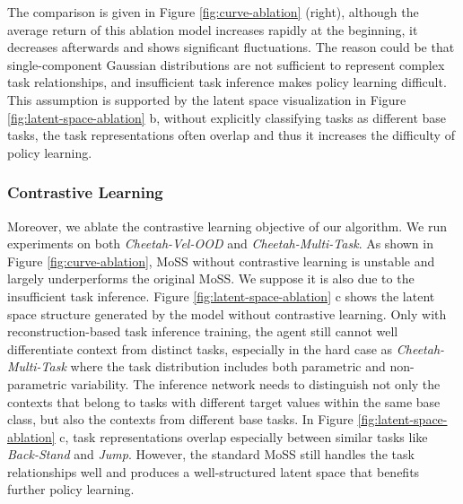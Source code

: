 \documentclass[letterpaper]{article} %
\begin{document}
The comparison is given in Figure \ref{fig:curve-ablation} (right), although the average return of this ablation model increases rapidly at the beginning, it decreases afterwards and shows significant fluctuations. The reason could be that single-component Gaussian distributions are not sufficient to represent complex task relationships, and insufficient task inference makes policy learning difficult. This assumption is supported by the latent space visualization in Figure \ref{fig:latent-space-ablation} b, without explicitly classifying tasks as different base tasks, the task representations often overlap and thus it increases the difficulty of policy learning.

\subsubsection{Contrastive Learning}
Moreover, we ablate the contrastive learning objective of our algorithm. We run experiments on both \emph{Cheetah-Vel-OOD } and \emph{Cheetah-Multi-Task}. As shown in Figure \ref{fig:curve-ablation}, MoSS without contrastive learning is unstable and largely underperforms the original MoSS. We suppose it is also due to the insufficient task inference. Figure \ref{fig:latent-space-ablation} c shows the latent space structure generated by the model without contrastive learning. Only with reconstruction-based task inference training, the agent still cannot well differentiate context from distinct tasks, especially in the hard case as \emph{Cheetah-Multi-Task} where the task distribution includes both parametric and non-parametric variability. The inference network needs to distinguish not only the contexts that belong to tasks with different target values within the same base class, but also the contexts from different base tasks. In Figure \ref{fig:latent-space-ablation} c, task representations overlap especially between similar tasks like \emph{Back-Stand} and \emph{Jump}. However, the standard MoSS still handles the task relationships well and produces a well-structured latent space that benefits further policy learning.
\end{document}
